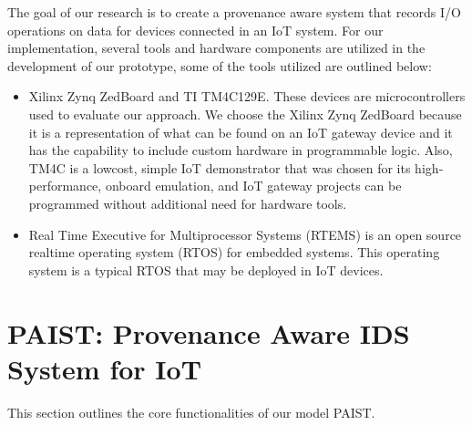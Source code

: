 The goal of our research is to create a provenance aware system that records I/O operations on data for devices connected in an IoT system. For our implementation, several tools and hardware components are utilized in the development of our prototype, some of the tools utilized are outlined below:

\begin{itemize}
\item Xilinx Zynq ZedBoard and TI TM4C129E. These devices are microcontrollers used to evaluate our approach. We choose the Xilinx Zynq ZedBoard because it is a representation of what can be found on an IoT gateway device and it has the capability to include custom hardware in programmable logic. Also, TM4C is a low­cost, simple IoT demonstrator that was chosen for its high­performance, on­board emulation, and IoT gateway projects can be programmed without additional need for hardware tools.

\item Real Time Executive for Multiprocessor Systems (RTEMS) is an open source real­time operating system (RTOS) for embedded systems. This operating system is a typical RTOS that may be deployed in IoT devices.

\end{itemize}


\section{PAIST: Provenance Aware IDS System for IoT }

This section outlines the core functionalities of our model PAIST. 